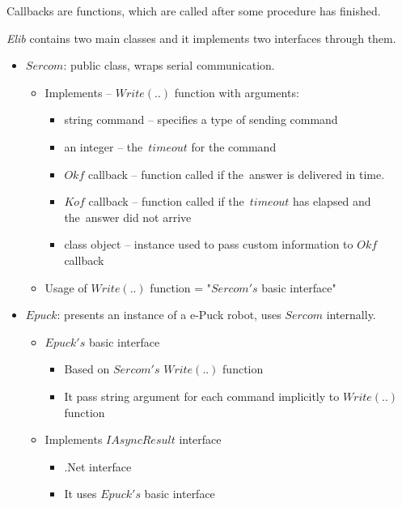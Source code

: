   \begin{remark}[Callbacks]
  Callbacks are functions, which are called after some procedure has finished.
  \end{remark}
  {\it Elib} contains two main classes and it implements two interfaces through them.
  \begin{itemize}
    \item $Sercom$: public class, wraps serial communication.
    \begin{itemize}
      \item Implements -- $Write(..)$ function with arguments:
      \begin{itemize}
        \item string command -- specifies a type of sending command
        \item an integer -- the~$timeout$ for the command
        \item $Okf$ callback -- function called if the~answer is delivered in time.
        \item $Kof$ callback -- function called if the~$timeout$ has elapsed and the~answer did not arrive
        \item class object -- instance used to pass custom information to $Okf$ callback
      \end{itemize}
      \item Usage of $Write(..)$ function = "$Sercom's$ basic interface"
    \end{itemize}
    \item $Epuck$: presents an instance of a e-Puck robot, uses $Sercom$ internally.
    \begin{itemize}
      \item $Epuck's$ basic interface 
      \begin{itemize}
        \item Based on $Sercom's$ $Write(..)$ function 
        \item It  pass string argument for each command implicitly to $Write(..)$ function
      \end{itemize}
      \item Implements $IAsyncResult$ interface
      \begin{itemize}
        \item .Net interface
        \item It uses $Epuck's$ basic interface
      \end{itemize}
    \end{itemize}
  \end{itemize}

